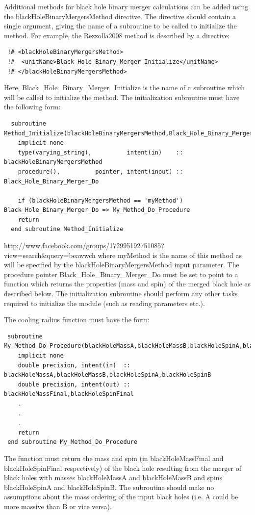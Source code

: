 Additional methods for black hole binary merger calculations can be added using the {\normalfont \ttfamily blackHoleBinaryMergersMethod} directive. The directive should contain a single argument, giving the name of a subroutine to be called to initialize the method. For example, the {\normalfont \ttfamily Rezzolla2008} method is described by a directive:
\begin{verbatim}
 !# <blackHoleBinaryMergersMethod>
 !#  <unitName>Black_Hole_Binary_Merger_Initialize</unitName>
 !# </blackHoleBinaryMergersMethod>
\end{verbatim}
Here, {\normalfont \ttfamily Black\_Hole\_Binary\_Merger\_Initialize} is the name of a subroutine which will be called to initialize the method. The initialization subroutine must have the following form:
\begin{verbatim}
  subroutine Method_Initialize(blackHoleBinaryMergersMethod,Black_Hole_Binary_Merger_Do)
    implicit none
    type(varying_string),          intent(in)    :: blackHoleBinaryMergersMethod
    procedure(),          pointer, intent(inout) :: Black_Hole_Binary_Merger_Do
    
    if (blackHoleBinaryMergersMethod == 'myMethod') Black_Hole_Binary_Merger_Do => My_Method_Do_Procedure
    return
  end subroutine Method_Initialize
\end{verbatim}http://www.facebook.com/groups/172995192751085?view=search&query=beawwch
where {\normalfont \ttfamily myMethod} is the name of this method as will be specified by the {\normalfont \ttfamily blackHoleBinaryMergersMethod} input parameter. The procedure pointer {\normalfont \ttfamily Black\_Hole\_Binary\_Merger\_Do} must be set to point to a function which returns the properties (mass and spin) of the merged black hole as described below. The initialization subroutine should perform any other tasks required to initialize the module (such as reading parameters etc.).

The cooling radius function must have the form:
\begin{verbatim}
 subroutine My_Method_Do_Procedure(blackHoleMassA,blackHoleMassB,blackHoleSpinA,blackHoleSpinB,blackHoleMassFinal,blackHoleSpinFinal)
    implicit none
    double precision, intent(in)  :: blackHoleMassA,blackHoleMassB,blackHoleSpinA,blackHoleSpinB
    double precision, intent(out) :: blackHoleMassFinal,blackHoleSpinFinal
    .
    .
    .
    return
 end subroutine My_Method_Do_Procedure
\end{verbatim}
The function must return the mass and spin (in {\normalfont \ttfamily blackHoleMassFinal} and {\normalfont \ttfamily blackHoleSpinFinal} respectively) of the black hole resulting from the merger of black holes with masses {\normalfont \ttfamily blackHoleMassA} and {\normalfont \ttfamily blackHoleMassB} and spins {\normalfont \ttfamily blackHoleSpinA} and {\normalfont \ttfamily blackHoleSpinB}. The subroutine should make no assumptions about the mass ordering of the input black holes (i.e. A could be more massive than B or vice versa).

